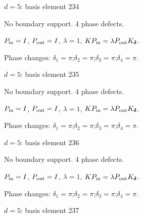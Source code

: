 {\Large $d=5$: basis element 234}\par
No boundary support. 4 phase defects.
\begin{center}
\end{center}
\vspace{-1mm}
$P_{\rm in}=I$, \quad $P_{\rm out}=I$, \quad $\lambda=1$, \qquad $K P_{\rm in}=\lambda P_{\rm out}K_{\boldsymbol\delta}$.
\par\smallskip\begin{minipage}{.98\linewidth}\small Phase changes: $\delta_{1}=\pi$;\quad $\delta_{2}=\pi$;\quad $\delta_{3}=\pi$;\quad $\delta_{4}=\pi$.\end{minipage}
\vfill
{\footnotesize\texttt{}}
\newpage
{}
{\Large $d=5$: basis element 235}\par
No boundary support. 4 phase defects.
\begin{center}
\end{center}
\vspace{-1mm}
$P_{\rm in}=I$, \quad $P_{\rm out}=I$, \quad $\lambda=1$, \qquad $K P_{\rm in}=\lambda P_{\rm out}K_{\boldsymbol\delta}$.
\par\smallskip\begin{minipage}{.98\linewidth}\small Phase changes: $\delta_{1}=\pi$;\quad $\delta_{2}=\pi$;\quad $\delta_{3}=\pi$;\quad $\delta_{4}=\pi$.\end{minipage}
\vfill
{\footnotesize\texttt{}}
\newpage
{}
{\Large $d=5$: basis element 236}\par
No boundary support. 4 phase defects.
\begin{center}
\end{center}
\vspace{-1mm}
$P_{\rm in}=I$, \quad $P_{\rm out}=I$, \quad $\lambda=1$, \qquad $K P_{\rm in}=\lambda P_{\rm out}K_{\boldsymbol\delta}$.
\par\smallskip\begin{minipage}{.98\linewidth}\small Phase changes: $\delta_{1}=\pi$;\quad $\delta_{2}=\pi$;\quad $\delta_{3}=\pi$;\quad $\delta_{4}=\pi$.\end{minipage}
\vfill
{\footnotesize\texttt{}}
\newpage
{}
{\Large $d=5$: basis element 237}\par
